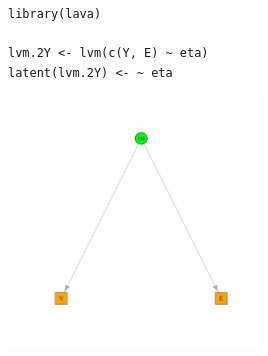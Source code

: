 \documentclass[12pt]{article}
\begin{document}
\lstset{language=r,label= ,caption= ,captionpos=b,numbers=none}
\begin{lstlisting}
library(lava)

lvm.2Y <- lvm(c(Y, E) ~ eta)
latent(lvm.2Y) <- ~ eta
\end{lstlisting}

\begin{center}
\includegraphics[width=0.5\textwidth]{./figures/show-bivariateLVM.pdf}
\end{center}
\end{document}
